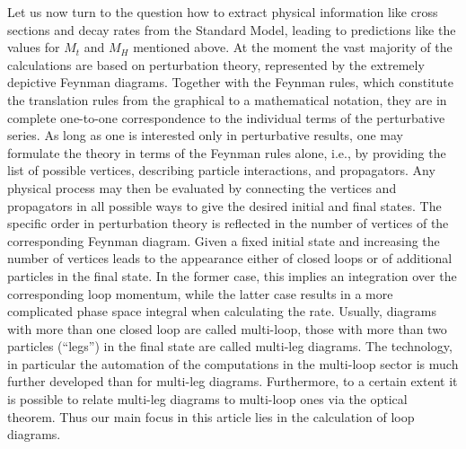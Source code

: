 Let us now turn to the question how to extract physical information like
cross sections and decay rates from the Standard Model, leading to
predictions like the values for $M_t$ and $M_H$ mentioned above. At the
moment the vast majority of the calculations are based on perturbation
theory, represented by the extremely depictive Feynman diagrams.
Together with the Feynman rules, which constitute the translation rules
from the graphical to a mathematical notation, they are in complete
one-to-one correspondence to the individual terms of the perturbative
series. As long as one is interested only in perturbative results, one
may formulate the theory in terms of the Feynman rules alone, i.e., by
providing the list of possible vertices, describing particle
interactions, and propagators. Any physical process may then be
evaluated by connecting the vertices and propagators in all possible
ways to give the desired initial and final states.  The specific order
in perturbation theory is reflected in the number of vertices of the
corresponding Feynman diagram. Given a fixed initial state and
increasing the number of vertices leads to the appearance either of
closed loops or of additional particles in the final state. In the
former case, this implies an integration over the corresponding loop
momentum, while the latter case results in a more complicated phase
space integral when calculating the rate. Usually, diagrams with more
than one closed loop are called multi-loop, those with more than two
particles (``legs'') in the final state are called multi-leg diagrams.
The technology, in particular the automation of the computations in the
multi-loop sector is much further developed than for multi-leg diagrams.
Furthermore, to a certain extent it is possible to relate multi-leg
diagrams to multi-loop ones via the optical theorem. Thus our main focus
in this article lies in the calculation of loop diagrams.

